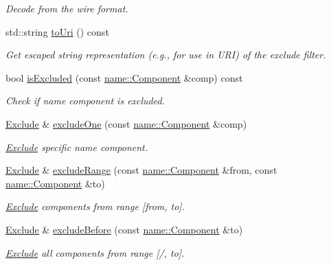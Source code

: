 \begin{DoxyCompactItemize}
\begin{DoxyCompactList}\small\item\em Decode from the wire format. \end{DoxyCompactList}\item 
std\+::string \hyperlink{classndn_1_1Exclude_a60ca4ea12b033f6c8086be514f4c0bab}{to\+Uri} () const\hypertarget{classndn_1_1Exclude_a60ca4ea12b033f6c8086be514f4c0bab}{}\label{classndn_1_1Exclude_a60ca4ea12b033f6c8086be514f4c0bab}

\begin{DoxyCompactList}\small\item\em Get escaped string representation (e.\+g., for use in U\+RI) of the exclude filter. \end{DoxyCompactList}\item 
bool \hyperlink{classndn_1_1Exclude_afe7e89b3119b70b7a9f66b45d574e350}{is\+Excluded} (const \hyperlink{classndn_1_1name_1_1Component}{name\+::\+Component} \&comp) const
\begin{DoxyCompactList}\small\item\em Check if name component is excluded. \end{DoxyCompactList}\item 
\hyperlink{classndn_1_1Exclude}{Exclude} \& \hyperlink{classndn_1_1Exclude_aa90385be6fd18937924a8c8df71557c4}{exclude\+One} (const \hyperlink{classndn_1_1name_1_1Component}{name\+::\+Component} \&comp)
\begin{DoxyCompactList}\small\item\em \hyperlink{classndn_1_1Exclude}{Exclude} specific name component. \end{DoxyCompactList}\item 
\hyperlink{classndn_1_1Exclude}{Exclude} \& \hyperlink{classndn_1_1Exclude_add899794f98c51df19f6ae911f6c764a}{exclude\+Range} (const \hyperlink{classndn_1_1name_1_1Component}{name\+::\+Component} \&from, const \hyperlink{classndn_1_1name_1_1Component}{name\+::\+Component} \&to)
\begin{DoxyCompactList}\small\item\em \hyperlink{classndn_1_1Exclude}{Exclude} components from range \mbox{[}from, to\mbox{]}. \end{DoxyCompactList}\item 
\hyperlink{classndn_1_1Exclude}{Exclude} \& \hyperlink{classndn_1_1Exclude_a6df09c1a0c6aaa08fe1a465b82c6c642}{exclude\+Before} (const \hyperlink{classndn_1_1name_1_1Component}{name\+::\+Component} \&to)
\begin{DoxyCompactList}\small\item\em \hyperlink{classndn_1_1Exclude}{Exclude} all components from range \mbox{[}/, to\mbox{]}. \end{DoxyCompactList}\item 

\end{DoxyCompactItemize}
